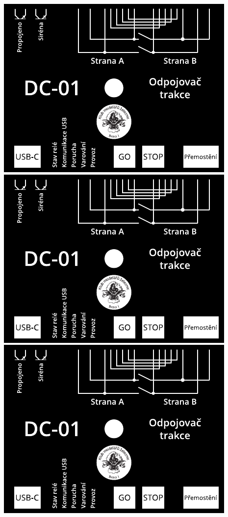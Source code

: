 \documentclass[12pt,a4paper,landscape]{article}
\begin{document}
\pagestyle{empty}
\setlength{\parindent}{0cm}
\setlength{\parskip}{5mm plus2pt minus2pt}

\noindent
\includegraphics{single.pdf} \hspace{1em}
\includegraphics{single.pdf} \hspace{1em}
\includegraphics{single.pdf}
\end{document}
